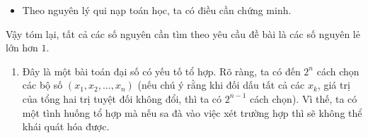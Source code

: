 \begin{bt}
{\begin{itemize}
\begin{itemize}
\begin{itemize}
					Như vậy, $n=3$ thỏa mãn yêu cầu đề bài.
				\end{itemize}
				\item Giả sử $n=2m-1$ với $m\in\mathbb{N}$, $m\ge2$, thỏa mãn yêu cầu đề bài.
				\item Xét $n=2m+1$. \\
				Xét $4m+2$ số thực tùy ý $a_1$, $a_2$, $\ldots$, $a_{2m+1}$ và $b_1$, $b_2$, $\ldots$, $b_{2m+1}$, thỏa mãn điều kiện $\left|a_k\right|+\left|b_k\right|=1$, với mọi $k=1,2,\ldots,2m+1$.\\
				Theo \textit{Nhận xét 1}, không mất tổng quát, có thể giả sử $a_k$, $b_k\ge0$, với mọi $k=1,2,3$, và do đó, có thể giả sử $a_1\le a_2\le a_3$.\\
				Đặt $\alpha=a_1-a_2+a_3$ và $\beta=b_1-b_2+b_3$. Khi đó, theo trường hợp 1 đã xét ở trên, ta có $|\alpha|+|\beta|=1$.\\
				Áp dụng giả thiết qui nạp cho $4m-2$ số thực $\alpha$, $a_4$, $a_5$, $\ldots$, $a_{2m+1}$ và $\beta$, $b_4$, $b_5$, $\ldots$, $b_{2m+1}$, ta có $2m-1$ số thực $\gamma$, $x_4$, $x_5$, $\ldots$, $x_{2m+1}\in\{-1;1\}$ mà $$\left|\gamma\alpha+\displaystyle\sum\limits_{k=4}^{2m+1}x_ka_k\right|+\left|\gamma\beta+\displaystyle\sum\limits_{k=4}^{2m+1}x_kb_k\right|\le1.\quad(2.1)$$
				Dễ thấy, bằng cách chọn $x_1=\gamma$, $x_2=-\gamma$, $x_3=\gamma$, ta sẽ có $x_1$, $x_2$, $x_3\in\{-1;1\}$ và $\gamma\alpha=\displaystyle\sum\limits_{k=1}^3x_ka_k$, $\gamma\beta=\displaystyle\sum\limits_{k=1}^3x_kb_k.\quad(2.2)$\\
				Hiển nhiên, $(2.1)$ và $(2.2)$ cho thấy tồn tại $2m+1$ số thực $x_1$, $x_2$, $\ldots$, $x_{2m+1}\in\{-1;1\}$ sao cho $\left|\displaystyle\sum\limits_{k=1}^{2m+1}x_ka_k\right|+\left|\displaystyle\sum\limits_{k=1}^{2m+1}x_kb_k\right|\le1$.\\
				Như vậy $n=2m+1$ thỏa mãn yêu cầu đề bài.
			\end{itemize}
			\item Theo nguyên lý qui nạp toán học, ta có điều cần chứng minh.
		\end{itemize}
		Vậy tóm lại, tất cả các số nguyên cần tìm theo yêu cầu đề bài là các số nguyên lẻ lớn hơn $1$.
		\begin{nx}\hfill
			\begin{enumerate}
				\item Đây là một bài toán đại số có yếu tố tổ hợp. Rõ ràng, ta có đến $2^n$ cách chọn các bộ số $(x_1,x_2,\ldots,x_n)$ (nếu chú ý rằng khi đối dấu tất cả các $x_k$, giá trị của tổng hai trị tuyệt đối không đổi, thì ta có $2^{n-1}$ cách chọn). Vì thế, ta có một tình huống tổ hợp mà nếu sa đà vào việc xét trường hợp thì sẽ không thể khái quát hóa được.

\end{enumerate}
\end{nx}}
\end{bt}
